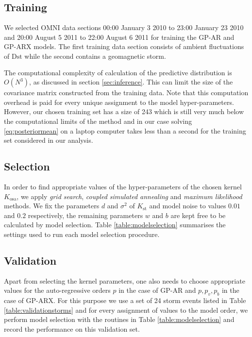 \subsection*{Training}

We selected OMNI data sections 00:00 January 3 2010 to 23:00 January 23 2010 and 20:00 August 5 2011 to 22:00 August 6 2011 for training the GP-AR and GP-ARX models. The first training data section consists of ambient fluctuations of $ \mathrm{Dst}$ while the second contains a geomagnetic storm.

The computational complexity of calculation of the predictive distribution is $O(N^3)$, as discussed in section \ref{sec:inference}. This can limit the size of the covariance matrix constructed from the training data. Note that this computation overhead is paid for every unique assignment to the model hyper-parameters. However, our chosen training set has a size of 243 which is still very much below the computational limits of the method and in our case solving \cref{eq:posteriormean} on a laptop computer takes less than a second for the training set considered in our analysis. 

\subsection*{Selection}

In order to find appropriate values of the hyper-parameters of the chosen kernel $K_{\text{osa}}$, we apply 
\emph{grid search}, \emph{coupled simulated annealing} and \emph{maximum likelihood} methods. We fix the parameters 
$d$ and $\sigma^2$ of $K_{\text{st}}$ and model noise to values $0.01$ and $0.2$ respectively, the remaining 
parameters $w$ and $b$ are kept free to be calculated by model selection. Table \ref{table:modelselection} 
summarises the settings used to run each model selection procedure.

\subsection*{Validation}

Apart from selecting the kernel parameters, one also needs to choose appropriate values for the auto-regressive orders $p$ in the case of GP-AR and $p, p_v, p_b$ in the case of GP-ARX. For this purpose we use a set of 24 storm events listed in Table \ref{table:validationstorms} and for every assignment of values to the model order, we perform model selection with the routines in Table \ref{table:modelselection} and record the performance on this validation set.

